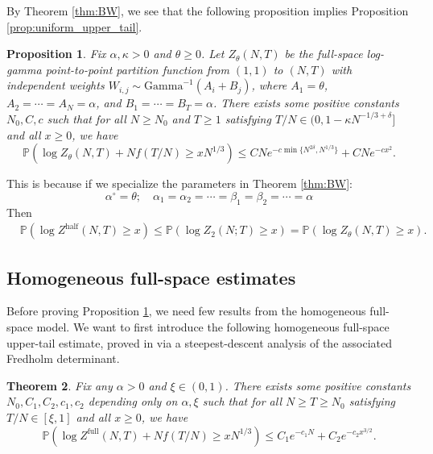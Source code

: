 \documentclass[11pt]{article}
\newtheorem{theorem}{Theorem}[section]
\newtheorem{proposition}[theorem]{Proposition}
\theoremstyle{definition}
\newcommand{\Prob}{\mathbb{P}}
\newcommand{\Zfull}{Z^{\mathrm{full}}}
\newcommand{\Zhalf}{Z^{\mathrm{half}}}
\begin{document}
By Theorem \ref{thm:BW}, we see that the following proposition implies Proposition \ref{prop:uniform_upper_tail}. 

\begin{proposition}\label{prop:inhomo_full_space}
    Fix $\alpha,\kappa > 0$ and $\theta \geq 0$. Let $Z_\theta(N,T)$ be the full-space log-gamma point-to-point partition function from
$(1,1)$ to $(N,T)$ with independent weights
$W_{i,j}\sim\mathrm{Gamma}^{-1}(A_i+B_j)$, where
$A_1=\theta$, $A_2=\cdots=A_N=\alpha$, and
$B_1=\cdots=B_T=\alpha$. There exists some positive constants $N_0, C, c$ such that for all $N \geq N_0$ and $T \geq 1$ satisfying $T/N \in (0, 1-\kappa N^{-1/3+\delta}]$ and all $x \geq 0$, we have
    \begin{equation}
        \Prob\left(\log Z_\theta(N,T) + Nf\left(T/N\right) \geq xN^{1/3}\right) \leq CNe^{-c \min \{N^{2\delta}, N^{1/3}\}} + CNe^{-cx^2}.
    \end{equation}  
\end{proposition}

This is because if we specialize the parameters in Theorem \ref{thm:BW}:
\[
\alpha^{\circ} = \theta; \quad \alpha_1 = \alpha_2 = \cdots = \beta_1 = \beta_2 = \cdots = \alpha
\]
Then
\begin{equation}
    \begin{aligned}
        &\Prob\left( \log \Zhalf(N,T)  \geq x\right) \leq \Prob\left( \log Z_2(N;T) \geq x \right) = \Prob\left( \log Z_\theta(N,T) \geq x\right).  
    \end{aligned}
\end{equation}

\subsection{Homogeneous full-space estimates}
Before proving Proposition \ref{prop:inhomo_full_space}, we need few results from the homogeneous full-space model. We want to first introduce the following homogeneous full-space upper-tail estimate, proved in \cite[Theorem~1.7]{barraquand2021fluctuations} via a steepest-descent analysis of the associated Fredholm determinant.
\begin{theorem}\label{thm:full-homogeneous}
    Fix any $\alpha > 0$ and $\xi \in (0,1)$. There exists some positive constants $N_0, C_1,C_2, c_1,c_2$ depending only on $\alpha,\xi$ such that for all $N \geq T \geq N_0$ satisfying $T/N \in [\xi, 1]$ and all $x \geq 0$, we have
    \begin{equation}
        \Prob\left(\log \Zfull(N,T) + Nf\left(T/N\right) \geq xN^{1/3}\right) \leq C_1e^{-c_1N} + C_2 e^{-c_2x^{3/2}}.
    \end{equation}  
\end{theorem}
\end{document}
